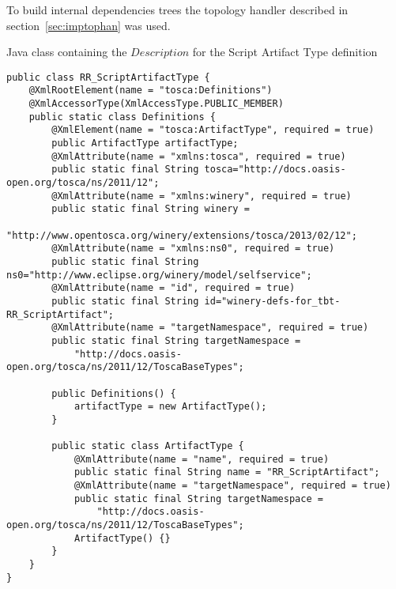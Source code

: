 To build internal dependencies trees the topology handler described in section~\ref{sec:imptophan} was used. 
\begin{Listing} 
	\caption{Java class containing the $Description$ for the Script Artifact Type definition}
	\label{lst:scripttype}
\begin{lstlisting}
public class RR_ScriptArtifactType {
	@XmlRootElement(name = "tosca:Definitions")
	@XmlAccessorType(XmlAccessType.PUBLIC_MEMBER)
	public static class Definitions {
		@XmlElement(name = "tosca:ArtifactType", required = true)
		public ArtifactType artifactType;
		@XmlAttribute(name = "xmlns:tosca", required = true)
		public static final String tosca="http://docs.oasis-open.org/tosca/ns/2011/12";
		@XmlAttribute(name = "xmlns:winery", required = true)
		public static final String winery =
			"http://www.opentosca.org/winery/extensions/tosca/2013/02/12";
		@XmlAttribute(name = "xmlns:ns0", required = true)
		public static final String ns0="http://www.eclipse.org/winery/model/selfservice";
		@XmlAttribute(name = "id", required = true)
		public static final String id="winery-defs-for_tbt-RR_ScriptArtifact";
		@XmlAttribute(name = "targetNamespace", required = true)
		public static final String targetNamespace =
			"http://docs.oasis-open.org/tosca/ns/2011/12/ToscaBaseTypes"; 
	
		public Definitions() {
			artifactType = new ArtifactType();
		}
	
		public static class ArtifactType {
			@XmlAttribute(name = "name", required = true)
			public static final String name = "RR_ScriptArtifact";
			@XmlAttribute(name = "targetNamespace", required = true)
			public static final String targetNamespace =
				"http://docs.oasis-open.org/tosca/ns/2011/12/ToscaBaseTypes"; 
			ArtifactType() {}
		}
	}
}
\end{lstlisting}
\end{Listing}
